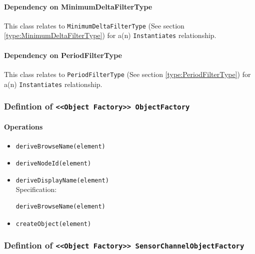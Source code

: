 \paragraph{Dependency on MinimumDeltaFilterType}

This class relates to \texttt{MinimumDeltaFilterType} (See section \ref{type:MinimumDeltaFilterType}) for a(n) \texttt{Instantiates} relationship.

\paragraph{Dependency on PeriodFilterType}

This class relates to \texttt{PeriodFilterType} (See section \ref{type:PeriodFilterType}) for a(n) \texttt{Instantiates} relationship.

\FloatBarrier
\subsubsection{Defintion of \texttt{<<Object Factory>> ObjectFactory}} \label{type:ObjectFactory}

\FloatBarrier



\paragraph{Operations}
\begin{itemize}
  \item \texttt{deriveBrowseName(element)}
  \item \texttt{deriveNodeId(element)}
  \item \texttt{deriveDisplayName(element)}\\
    Specification:
   \indent \begin{lstlisting}
deriveBrowseName(element)
\end{lstlisting}

  \item \texttt{createObject(element)}
\end{itemize}
\FloatBarrier
\subsubsection{Defintion of \texttt{<<Object Factory>> SensorChannelObjectFactory}} \label{type:SensorChannelObjectFactory}

\FloatBarrier



